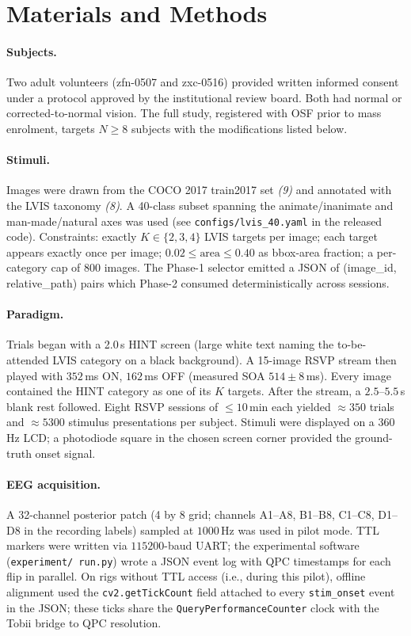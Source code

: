 \documentclass[12pt]{article}
\begin{document}
\section*{Materials and Methods}

\paragraph*{Subjects.}
Two adult volunteers (zfn-0507 and zxc-0516) provided written
informed consent under a protocol approved by the institutional
review board.  Both had normal or corrected-to-normal vision.  The
full study, registered with OSF prior to mass enrolment, targets
$N\geq8$ subjects with the modifications listed below.

\paragraph*{Stimuli.}
Images were drawn from the COCO 2017 train2017 set \textit{(9)} and
annotated with the LVIS taxonomy \textit{(8)}.  A 40-class subset
spanning the animate/inanimate and man-made/natural axes was used
(see \texttt{configs/lvis\_40.yaml} in the released code).
Constraints: exactly $K\in\{2,3,4\}$ LVIS targets per image; each
target appears exactly once per image; $0.02\leq\mbox{area}\leq
0.40$ as bbox-area fraction; a per-category cap of 800
images.  The Phase-1 selector emitted a JSON of (image\_id,
relative\_path) pairs which Phase-2 consumed deterministically
across sessions.

\paragraph*{Paradigm.}
Trials began with a 2.0\,s HINT screen (large white text naming
the to-be-attended LVIS category on a black background).  A
15-image RSVP stream then played with $352$\,ms ON,
$162$\,ms OFF (measured SOA $514\pm8$\,ms).  Every image
contained the HINT category as one of its $K$ targets.  After the
stream, a $2.5$--$5.5$\,s blank rest followed.  Eight RSVP
sessions of $\leq10$\,min each yielded $\approx 350$ trials and
$\approx 5300$ stimulus presentations per subject.  Stimuli were
displayed on a 360\,Hz LCD; a photodiode square in the chosen
screen corner provided the ground-truth onset signal.

\paragraph*{EEG acquisition.}
A 32-channel posterior patch (4 by 8 grid; channels A1--A8,
B1--B8, C1--C8, D1--D8 in the recording labels) sampled at
$1000$\,Hz was used in pilot mode.  TTL markers were written via
$115200$-baud UART; the experimental software (\texttt{experiment/
run.py}) wrote a JSON event log with QPC timestamps for each flip
in parallel.  On rigs without TTL access (i.e., during this
pilot), offline alignment used the
\texttt{cv2.getTickCount} field attached to every \texttt{stim\_onset}
event in the JSON; these ticks share the \texttt{QueryPerformanceCounter}
clock with the Tobii bridge to QPC resolution.
\end{document}
